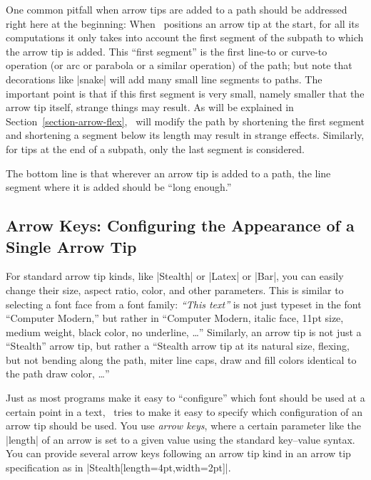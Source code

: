 One common pitfall when arrow tips are added to a path should be
addressed right here at the beginning: When \tikzname\ positions an
arrow tip at the start, for all its computations it only takes into
account the first segment of the subpath to which the arrow tip is
added. This ``first segment'' is the first line-to or curve-to operation (or arc
or parabola or a similar operation) of the path; but note that
decorations like |snake| will add many small line segments to
paths. The important point 
is that if this first segment is very small, namely smaller that the
arrow tip itself, strange things may result. As will be explained in
Section~\ref{section-arrow-flex}, \tikzname\ will modify the path by
shortening the first segment and shortening a segment below its length
may result in strange effects. Similarly, for tips at the end of a
subpath, only the last segment is considered.

The bottom line is that wherever an arrow tip is added to a path, the
line segment where it is added should be ``long enough.'' 




\subsection{Arrow Keys: Configuring the Appearance of a Single Arrow Tip}
\label{section-arrow-config}

For standard arrow tip kinds, like |Stealth| or |Latex| or |Bar|, 
you can easily change their size, aspect ratio, color, and other
parameters. This is similar to selecting a font face from a font
family: \emph{``This text''} is not just typeset in the font 
``Computer Modern,'' but rather in ``Computer Modern, italic face,
11pt size, medium weight, black color, no underline, \dots''
Similarly, an arrow tip is not just a ``Stealth'' arrow tip, but
rather a ``Stealth arrow tip at its natural size, flexing, but not
bending along the path, miter line caps, draw and fill colors
identical to the path draw color, \dots''

Just as most programs make it easy to ``configure'' which font should
be used at a certain point in a text, \tikzname\ tries to make it easy
to specify which configuration of an arrow tip should be used. You use
\emph{arrow keys}, where a certain parameter like the |length| of an
arrow is set to a given value using the standard key--value
syntax. You can provide several arrow keys following an arrow tip kind
in  an arrow tip specification as in
|Stealth[length=4pt,width=2pt]|.

